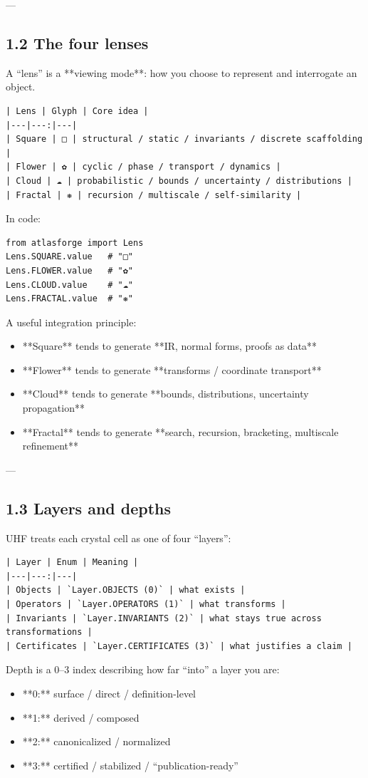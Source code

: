 \documentclass[11pt]{article}
\begin{document}
---

\subsection{1.2 The four lenses}

A “lens” is a **viewing mode**: how you choose to represent and interrogate an object.

\begin{lstlisting}
| Lens | Glyph | Core idea |
|---|---:|---|
| Square | □ | structural / static / invariants / discrete scaffolding |
| Flower | ✿ | cyclic / phase / transport / dynamics |
| Cloud | ☁ | probabilistic / bounds / uncertainty / distributions |
| Fractal | ❋ | recursion / multiscale / self-similarity |
\end{lstlisting}
In code:

\begin{lstlisting}
from atlasforge import Lens
Lens.SQUARE.value   # "□"
Lens.FLOWER.value   # "✿"
Lens.CLOUD.value    # "☁"
Lens.FRACTAL.value  # "❋"
\end{lstlisting}

A useful integration principle:

\begin{itemize}
\item **Square** tends to generate **IR, normal forms, proofs as data**
\item **Flower** tends to generate **transforms / coordinate transport**
\item **Cloud** tends to generate **bounds, distributions, uncertainty propagation**
\item **Fractal** tends to generate **search, recursion, bracketing, multiscale refinement**
\end{itemize}

---

\subsection{1.3 Layers and depths}

UHF treats each crystal cell as one of four “layers”:

\begin{lstlisting}
| Layer | Enum | Meaning |
|---|---:|---|
| Objects | `Layer.OBJECTS (0)` | what exists |
| Operators | `Layer.OPERATORS (1)` | what transforms |
| Invariants | `Layer.INVARIANTS (2)` | what stays true across transformations |
| Certificates | `Layer.CERTIFICATES (3)` | what justifies a claim |
\end{lstlisting}
Depth is a 0–3 index describing how far “into” a layer you are:
\begin{itemize}
\item **0:** surface / direct / definition-level
\item **1:** derived / composed
\item **2:** canonicalized / normalized
\item **3:** certified / stabilized / “publication-ready”
\end{itemize}
\end{document}
